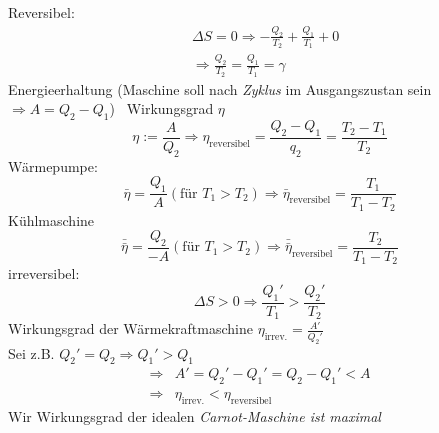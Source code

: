 \begin{enumerate}
Reversibel:
\begin{equation}
\begin{split}
  & \Delta S = 0 \Rightarrow - \frac{Q_2}{T_2} + \frac{Q_1}{T_1} + 0  \\
  & \Rightarrow \frac{Q_2}{T_2} = \frac{Q_1}{T_1} = \gamma
\end{split}
\end{equation}
Energieerhaltung (Maschine soll nach \emph{Zyklus} im Ausgangszustan sein $\Rightarrow A = Q_2 - Q_1$) \
Wirkungsgrad $\eta$
\begin{equation}
  \eta := \frac{A}{Q_2} \Rightarrow \eta_{\text{reversibel}} = \frac{Q_2 - Q_1}{q_2} = \frac{T_2 - T_1}{T_2}
\end{equation}
Wärmepumpe:
\begin{equation}
\bar{\eta} = \frac{Q_1}{A} (\text{für } T_1 > T_2) \Rightarrow \bar{\eta}_{\text{reversibel}} = \frac{T_1}{T_1 - T_2}
\end{equation}
Kühlmaschine
\begin{equation}
\bar{\bar{\eta}} = \frac{Q_2}{-A} (\text{für } T_1 > T_2) \Rightarrow \bar{\bar{\eta}}_{\text{reversibel}} = \frac{T_2}{T_1-T_2}
\end{equation}
irreversibel:
\begin{equation}
  \Delta S > 0 \Rightarrow \frac{Q_1'}{T_1} > \frac{Q_2'}{T_2}
\end{equation}
Wirkungsgrad der Wärmekraftmaschine $\eta_{\text{irrev.}} = \frac{A'}{Q_2'}$ \\
Sei z.B. $Q_2' = Q_2 \Rightarrow Q_1' > Q_1$
\begin{equation}
\begin{split}
  \Rightarrow & A' = Q_2' - Q_1' = Q_2 - Q_1' < A \\
  \Rightarrow & \eta_\text{irrev.} < \eta_\text{reversibel}
\end{split}
\end{equation}
Wir Wirkungsgrad der idealen \emph{Carnot-Maschine ist maximal}
\end{enumerate}

